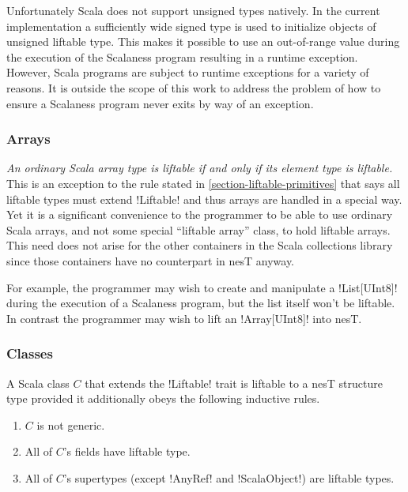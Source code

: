 Unfortunately Scala does not support unsigned types natively. In the current implementation a
sufficiently wide signed type is used to initialize objects of unsigned liftable type. This
makes it possible to use an out-of-range value during the execution of the Scalaness program
resulting in a runtime exception. However, Scala programs are subject to runtime exceptions for
a variety of reasons. It is outside the scope of this work to address the problem of how to
ensure a Scalaness program never exits by way of an exception.

\subsubsection{Arrays}
\label{section-liftable-arrays}

\emph{An ordinary Scala array type is liftable if and only if its element type is liftable.}
This is an exception to the rule stated in \autoref{section-liftable-primitives} that says all
liftable types must extend !Liftable! and thus arrays are handled in a special way. Yet it is a
significant convenience to the programmer to be able to use ordinary Scala arrays, and not some
special ``liftable array'' class, to hold liftable arrays. This need does not arise for the
other containers in the Scala collections library since those containers have no counterpart in
nesT anyway.

For example, the programmer may wish to create and manipulate a !List[UInt8]! during the
execution of a Scalaness program, but the list itself won't be liftable. In contrast the
programmer may wish to lift an !Array[UInt8]! into nesT.

\subsubsection{Classes}
\label{section-liftable-classes}

A Scala class $C$ that extends the !Liftable! trait is liftable to a nesT structure type
provided it additionally obeys the following inductive rules.

\begin{enumerate}
\item $C$ is not generic.
\item All of $C$'s fields have liftable type.
\item All of $C$'s supertypes (except !AnyRef! and !ScalaObject!) are liftable types.
\end{enumerate}

